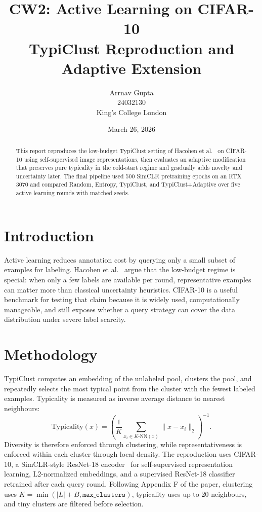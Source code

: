 \documentclass[10pt,a4paper,twocolumn]{article}
\title{CW2: Active Learning on CIFAR-10\\TypiClust Reproduction and Adaptive Extension}
\author{Arrnav Gupta\\24032130\\King's College London}
\date{March 26, 2026}
\begin{document}
\maketitle

\begin{abstract}
This report reproduces the low-budget TypiClust setting of Hacohen et al.~\cite{hacohen2022active} on CIFAR-10 using self-supervised image representations, then evaluates an adaptive modification that preserves pure typicality in the cold-start regime and gradually adds novelty and uncertainty later. The final pipeline used 500 SimCLR pretraining epochs on an RTX 3070 and compared Random, Entropy, TypiClust, and TypiClust+Adaptive over five active learning rounds with matched seeds.
\end{abstract}

\section{Introduction}
Active learning reduces annotation cost by querying only a small subset of examples for labeling. Hacohen et al.~\cite{hacohen2022active} argue that the low-budget regime is special: when only a few labels are available per round, representative examples can matter more than classical uncertainty heuristics. CIFAR-10 is a useful benchmark for testing that claim because it is widely used, computationally manageable, and still exposes whether a query strategy can cover the data distribution under severe label scarcity.

\section{Methodology}
TypiClust computes an embedding of the unlabeled pool, clusters the pool, and repeatedly selects the most typical point from the cluster with the fewest labeled examples. Typicality is measured as inverse average distance to nearest neighbours:
\[
\text{Typicality}(x) = \left(\frac{1}{K} \sum_{x_i \in K\text{-NN}(x)} \lVert x-x_i \rVert_2\right)^{-1}.
\]
Diversity is therefore enforced through clustering, while representativeness is enforced within each cluster through local density. The reproduction uses CIFAR-10, a SimCLR-style ResNet-18 encoder~\cite{chen2020simclr} for self-supervised representation learning, L2-normalized embeddings, and a supervised ResNet-18 classifier retrained after each query round. Following Appendix F of the paper, clustering uses \(K=\min(|L|+B,\texttt{max\_clusters})\), typicality uses up to 20 neighbours, and tiny clusters are filtered before selection.
\end{document}
